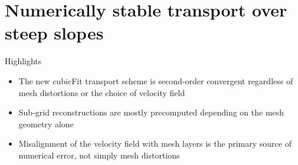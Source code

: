 \chapter{Numerically stable transport over steep slopes}
\label{ch:cubicFit}

\begin{highlights}
{\Large Highlights}
\begin{itemize}
	\item The new cubicFit transport scheme is second-order convergent regardless of mesh distortions or the choice of velocity field
	\item Sub-grid reconstructions are mostly precomputed depending on the mesh geometry alone
	\item Misalignment of the velocity field with mesh layers is the primary source of numerical error, not simply mesh distortions
\end{itemize}
\end{highlights}










